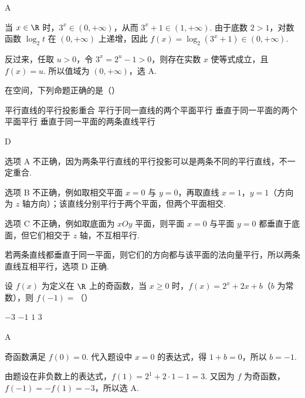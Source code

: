 \begin{answer}
A
\end{answer}

\begin{solution}
当 \(x\in\R\) 时，\(3^x\in(0,+\infty)\)，从而 \(3^x+1\in(1,+\infty)\). 由于底数 \(2>1\)，对数函数 \(\log_2 t\) 在 \((0,+\infty)\) 上递增，因此
\(f(x)=\log_2(3^x+1)\in(0,+\infty)\).

反过来，任取 \(u>0\)，令 \(3^x=2^u-1>0\)，则存在实数 \(x\) 使等式成立，且 \(f(x)=u\). 所以值域为 \((0,+\infty)\)，选 A.
\end{solution}

\begin{problem}
在空间，下列命题正确的是（\quad）

\choices
    {平行直线的平行投影重合}
    {平行于同一直线的两个平面平行}
    {垂直于同一平面的两个平面平行}
    {垂直于同一平面的两条直线平行}
\end{problem}

\begin{answer}
D
\end{answer}

\begin{solution}
选项 A 不正确，因为两条平行直线的平行投影可以是两条不同的平行直线，不一定重合.

选项 B 不正确，例如取相交平面 \(x=0\) 与 \(y=0\)，再取直线 \(x=1\)，\(y=1\)（方向为 \(z\) 轴方向）；该直线分别平行于两个平面，但两个平面相交.

选项 C 不正确，例如取底面为 \(xOy\) 平面，则平面 \(x=0\) 与平面 \(y=0\) 都垂直于底面，但它们相交于 \(z\) 轴，不互相平行.

若两条直线都垂直于同一平面，则它们的方向都与该平面的法向量平行，所以两条直线互相平行，选项 D 正确.
\end{solution}

\begin{problem}
设 \(f(x)\) 为定义在 \(\R\) 上的奇函数，当 \(x \geqslant 0\) 时，\(f(x) = 2^x + 2x + b\)（\(b\) 为常数），则 \(f(-1) =\)（\quad）

\choices
    {\(-3\)}
    {\(-1\)}
    {\(1\)}
    {\(3\)}
\end{problem}

\begin{answer}
A
\end{answer}

\begin{solution}
奇函数满足 \(f(0)=0\). 代入题设中 \(x=0\) 的表达式，得 \(1+b=0\)，所以 \(b=-1\).

由题设在非负数上的表达式，\(f(1)=2^1+2\cdot1-1=3\). 又因为 \(f\) 为奇函数，\(f(-1)=-f(1)=-3\)，所以选 A.
\end{solution}

